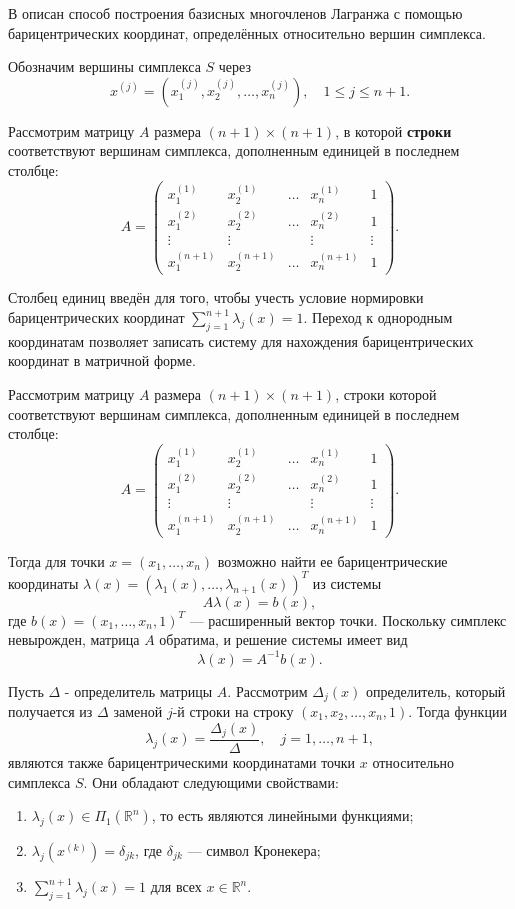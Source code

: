 \documentclass[a4paper,12pt]{article}
\theoremstyle{indented}
\begin{document}
В \cite{nevsky_geo} описан способ построения базисных многочленов Лагранжа с помощью барицентрических координат, определённых относительно вершин симплекса.

Обозначим вершины симплекса $S$ через
\[
x^{(j)} = \left(x_1^{(j)}, x_2^{(j)}, \dots, x_n^{(j)}\right), \quad 1 \le j \le n+1.
\]

Рассмотрим матрицу $A$ размера $(n+1) \times (n+1)$, в которой \textbf{строки} соответствуют вершинам симплекса, дополненным единицей в последнем столбце:
\[
A = \begin{pmatrix}
x_1^{(1)} & x_2^{(1)} & \dots & x_n^{(1)} & 1 \\
x_1^{(2)} & x_2^{(2)} & \dots & x_n^{(2)} & 1 \\
\vdots & \vdots & & \vdots & \vdots \\
x_1^{(n+1)} & x_2^{(n+1)} & \dots & x_n^{(n+1)} & 1
\end{pmatrix}.
\]

Столбец единиц введён для того, чтобы учесть условие нормировки барицентрических координат $\sum_{j=1}^{n+1} \lambda_j(x) = 1$. Переход к однородным координатам позволяет записать систему для нахождения барицентрических координат в матричной форме.
\par
Рассмотрим матрицу $A$ размера $(n+1) \times (n+1)$, строки которой соответствуют вершинам симплекса, дополненным единицей в последнем столбце:
\[
A = \begin{pmatrix}
x_1^{(1)} & x_2^{(1)} & \dots & x_n^{(1)} & 1 \\
x_1^{(2)} & x_2^{(2)} & \dots & x_n^{(2)} & 1 \\
\vdots & \vdots & & \vdots & \vdots \\
x_1^{(n+1)} & x_2^{(n+1)} & \dots & x_n^{(n+1)} & 1
\end{pmatrix}.
\]
\par
Тогда для точки $x = (x_1, \dots, x_n)$ возможно найти ее барицентрические координаты $\lambda(x) = (\lambda_1(x), \dots, \lambda_{n+1}(x))^T$ из системы
\[
A \lambda(x) = b(x),
\]
где $b(x) = (x_1, \dots, x_n, 1)^T$ — расширенный вектор точки. Поскольку симплекс невырожден, матрица $A$ обратима, и решение системы имеет вид
\[
\lambda(x) = A^{-1} b(x).
\]
\par
Пусть $\Delta$ - определитель матрицы $A$. Рассмотрим $\Delta_j(x)$ определитель, который получается из $\Delta$ заменой $j$-й строки на строку $(x_1, x_2, \dots, x_n, 1)$. Тогда функции
\[
\lambda_j(x) = \frac{\Delta_j(x)}{\Delta}, \quad j = 1, \dots, n+1,
\]
являются также барицентрическими координатами точки $x$ относительно симплекса $S$. Они обладают следующими свойствами:
\begin{enumerate}
    \item $\lambda_j(x) \in \Pi_1(\mathbb{R}^n)$, то есть являются линейными функциями;
    \item $\lambda_j(x^{(k)}) = \delta_{jk}$, где $\delta_{jk}$ — символ Кронекера;
    \item $\sum_{j=1}^{n+1} \lambda_j(x) = 1$ для всех $x \in \mathbb{R}^n$.
\end{enumerate}
\end{document}
